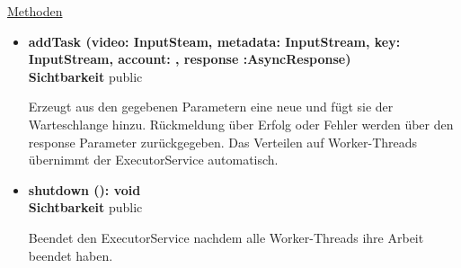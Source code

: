 \underline{Methoden}
\begin{itemize}
\itemsep0pt
\item \textbf{addTask (video: InputSteam, metadata: InputStream, 
key: InputStream, account: , response :AsyncResponse)}\hfill\\
\textbf{Sichtbarkeit} public

Erzeugt aus den gegebenen Parametern eine neue  und fügt sie der Warteschlange hinzu. Rückmeldung über Erfolg oder Fehler werden über den response Parameter zurückgegeben. Das Verteilen auf Worker-Threads übernimmt der ExecutorService automatisch.

\item \textbf{shutdown (): void}\hfill\\
\textbf{Sichtbarkeit} public

Beendet den ExecutorService nachdem alle Worker-Threads ihre Arbeit beendet haben.

\end{itemize}